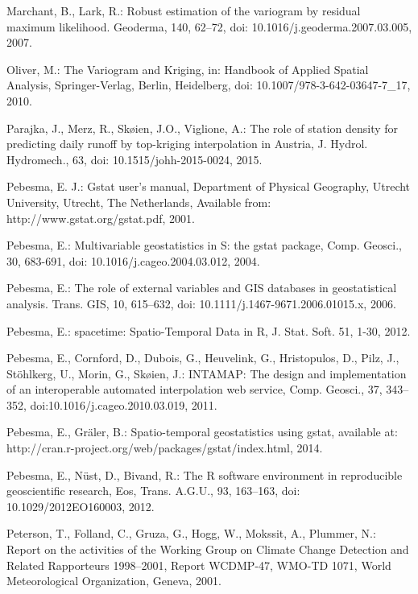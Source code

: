 \begin{thebibliography}
\bibitem{} \hangindent=1cm Marchant, B., Lark, R.: Robust estimation of the variogram by residual maximum likelihood. Geoderma, 140, 62–72, doi: 10.1016/j.geoderma.2007.03.005, 2007.

\bibitem{} \hangindent=1cm Oliver, M.: The Variogram and Kriging, in: Handbook of Applied Spatial Analysis, Springer-Verlag, Berlin, Heidelberg, doi: 10.1007/978-3-642-03647-7_17, 2010.

\bibitem{} \hangindent=1cm Parajka, J., Merz, R., Skøien, J.O., Viglione, A.: The role of station density for predicting daily runoff by top-kriging interpolation in Austria, J. Hydrol. Hydromech., 63, doi: 10.1515/johh-2015-0024, 2015.

\bibitem{} \hangindent=1cm Pebesma, E. J.: Gstat user’s manual, Department of Physical Geography, Utrecht University, Utrecht, The Netherlands, Available from: http://www.gstat.org/gstat.pdf, 2001.

\bibitem{} \hangindent=1cm Pebesma, E.: Multivariable geostatistics in S: the gstat package, Comp. Geosci., 30, 683-691, doi: 10.1016/j.cageo.2004.03.012, 2004.

\bibitem{} \hangindent=1cm Pebesma, E.: The role of external variables and GIS databases in geostatistical analysis. Trans. GIS, 10, 615–632, doi: 10.1111/j.1467-9671.2006.01015.x, 2006.

\bibitem{} \hangindent=1cm Pebesma, E.: spacetime: Spatio-Temporal Data in R, J. Stat. Soft. 51, 1-30, 2012.

\bibitem{} \hangindent=1cm Pebesma, E., Cornford, D., Dubois, G., Heuvelink, G., Hristopulos, D., Pilz, J., Stöhlkerg, U., Morin, G., Skøien, J.: INTAMAP: The design and implementation of an interoperable automated interpolation web service, Comp. Geosci., 37, 343–352, doi:10.1016/j.cageo.2010.03.019, 2011.

\bibitem{} \hangindent=1cm Pebesma, E., Gräler, B.: Spatio-temporal geostatistics using gstat, available at: http://cran.r-project.org/web/packages/gstat/index.html, 2014.

\bibitem{} \hangindent=1cm Pebesma, E., Nüst, D., Bivand, R.: The R software environment in reproducible geoscientific research, Eos, Trans. A.G.U., 93, 163–163, doi: 10.1029/2012EO160003, 2012.

\bibitem{} \hangindent=1cm Peterson, T., Folland, C., Gruza, G., Hogg, W., Mokssit, A., Plummer, N.: Report on the activities of the Working Group on Climate Change Detection and Related Rapporteurs 1998–2001, Report WCDMP-47, WMO-TD 1071, World Meteorological Organization, Geneva, 2001.


\end{thebibliography}
